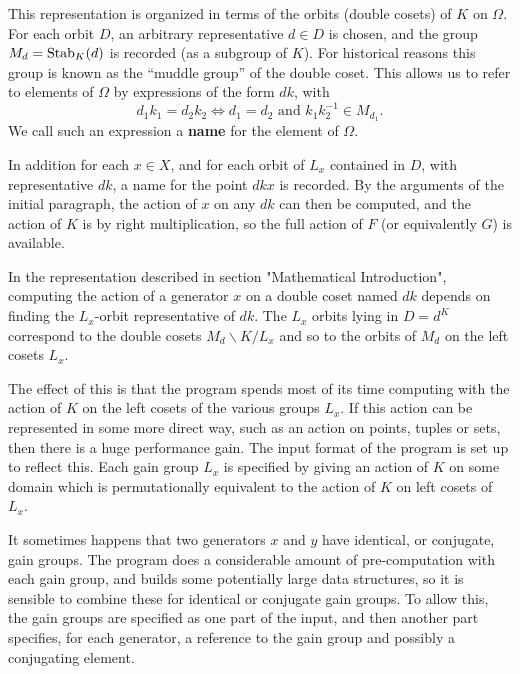 This representation is  organized in terms  of the orbits (double cosets)
of $K$ on $\Omega$. For each orbit $D$, an arbitrary representative $d\in
D$ is chosen, and the group $M_d = \mathord{\mbox{Stab}}_K(d)$ is recorded (as a subgroup
of $K$). For  historical  reasons this  group is  known  as the  ``muddle
group'' of  the  double coset.  This  allows us to  refer to  elements of
$\Omega$  by expressions of  the form $dk$, with
\begin{displaymath}
d_1k_1 = d_2k_2 \iff d_1 = d_2 \mbox{ and }k_1k_2^{-1}\in M_{d_1}.
\end{displaymath}
We call such an expression a {\bf name} for the element of $\Omega$.

In addition for each $x\in  X$, and for each  orbit of $L_x$ contained in
$D$, with representative $dk$, a name for the point $dkx$ is recorded. By
the arguments of the initial paragraph, the action of $x$ on any $dk$ can
then be computed,  and the action of  $K$ is by right  multiplication, so
the full action of $F$ (or equivalently $G$) is available.


In the representation described  in section "Mathematical  Introduction",
computing  the  action of a generator  $x$  on a double coset  named $dk$
depends   on finding the  $L_x$-orbit representative  of  $dk$. The $L_x$
orbits lying in $D = d^K$ correspond to  the double cosets $M_d\backslash
K/L_x$ and so to the orbits of $M_d$ on the left cosets $L_x$.

The effect of this is that the program spends most  of its time computing
with the action of $K$ on the left cosets of the various groups $L_x$. If
this action can be represented in some more direct way, such as an action
on points,  tuples or sets, then  there is a  huge  performance gain. The
input  format of the program is  set up to reflect  this. Each gain group
$L_x$ is specified by  giving an action of  $K$ on  some domain which  is
permutationally equivalent to the action of $K$ on left cosets of $L_x$.

It  sometimes happens that two generators  $x$ and $y$ have identical, or
conjugate,  gain  groups.   The program does    a  considerable amount of
pre-computation  with each gain  group, and builds some potentially large
data structures, so it  is  sensible to combine   these for identical  or
conjugate  gain groups. To allow this,  the gain groups  are specified as
one part   of the  input,  and  then another  part  specifies,   for each
generator, a    reference to the gain group    and possibly a conjugating
element.

